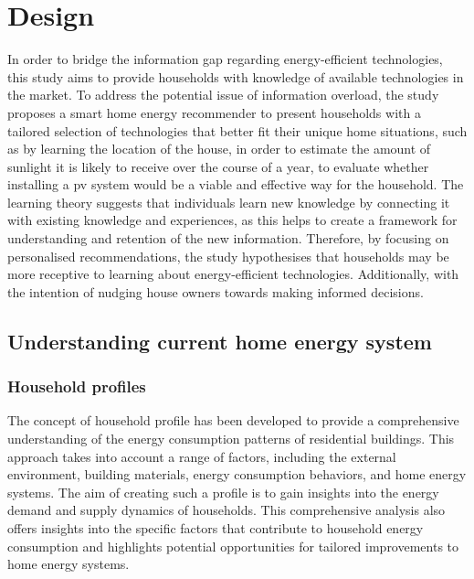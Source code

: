 \chapter{Design} 

In order to bridge the information gap regarding energy-efficient technologies, this study aims to provide households with knowledge of available technologies in the market. 
To address the potential issue of information overload, the study proposes a smart home energy recommender to present households with a tailored selection of technologies that better fit their unique home situations, 
such as by learning the location of the house, in order to estimate the amount of sunlight it is likely to receive over the course of a year, to evaluate whether installing a \gls{pv} system would be a viable and effective way for the household.
The learning theory suggests that individuals learn new knowledge by connecting it with existing knowledge and experiences, as this helps to create a framework for understanding and retention of the new information.
Therefore, by focusing on personalised recommendations, the study hypothesises that households may be more receptive to learning about energy-efficient technologies. 
Additionally, with the intention of nudging house owners towards making informed decisions. 

\section{Understanding current home energy system}


\subsection{Household profiles}

The concept of household profile has been developed to provide a comprehensive understanding of the energy consumption patterns of residential buildings. 
This approach takes into account a range of factors, including the external environment, building materials, energy consumption behaviors, and home energy systems. 
The aim of creating such a profile is to gain insights into the energy demand and supply dynamics of households. 
This comprehensive analysis also offers insights into the specific factors that contribute to household energy consumption and highlights potential opportunities for tailored improvements to home energy systems. 

